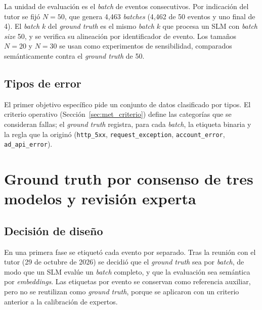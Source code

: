 La unidad de evaluación es el \textit{batch} de eventos consecutivos. Por indicación del tutor se fijó $N=50$, que genera 4{,}463 \textit{batches} (4{,}462 de 50 eventos y uno final de 4). El \textit{batch} $k$ del \textit{ground truth} es el mismo \textit{batch} $k$ que procesa un SLM con \textit{batch size} 50, y se verifica su alineación por identificador de evento. Los tamaños $N=20$ y $N=30$ se usan como experimentos de sensibilidad, comparados semánticamente contra el \textit{ground truth} de 50.

\subsection{Tipos de error}\label{subsec:met_tipos}

El primer objetivo específico pide un conjunto de datos clasificado por tipos. El criterio operativo (Sección~\ref{sec:met_criterio}) define las categorías que se consideran fallas; el \textit{ground truth} registra, para cada \textit{batch}, la etiqueta binaria y la regla que la originó (\texttt{http\_5xx}, \texttt{request\_exception}, \texttt{account\_error}, \texttt{ad\_api\_error}). %

\section{Ground truth por consenso de tres modelos y revisión experta}\label{sec:met_gt}

\subsection{Decisión de diseño}

En una primera fase se etiquetó cada evento por separado. Tras la reunión con el tutor (29 de octubre de 2026) se decidió que el \textit{ground truth} sea por \textit{batch}, de modo que un SLM evalúe un \textit{batch} completo, y que la evaluación sea semántica por \textit{embeddings}. Las etiquetas por evento se conservan como referencia auxiliar, pero no se reutilizan como \textit{ground truth}, porque se aplicaron con un criterio anterior a la calibración de expertos.

